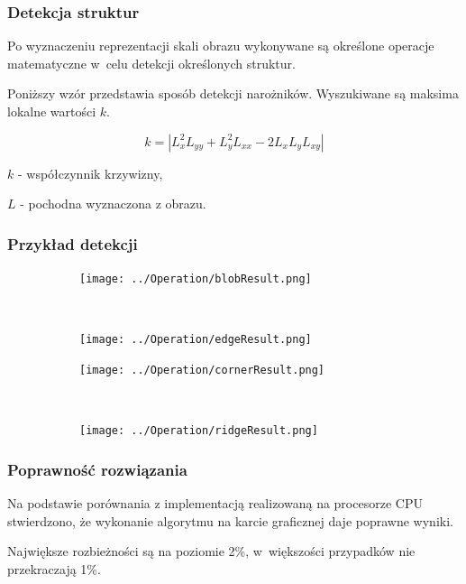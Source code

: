 \begin{frame}
\frametitle{Detekcja struktur}

Po wyznaczeniu reprezentacji skali obrazu wykonywane są określone operacje matematyczne w~celu detekcji określonych struktur.

Poniższy wzór przedstawia sposób detekcji narożników. Wyszukiwane są maksima lokalne wartości $ k $.

$$ k = |L_x^2L_{yy}  + L_y^2L_{xx} - 2L_xL_yL_{xy}| $$

$ k $ - współczynnik krzywizny,

$ L $ - pochodna wyznaczona z obrazu.



\end{frame}
\begin{frame}
\frametitle{Przykład detekcji}

\begin{figure}[h]
\begin{center}
\begin{subfigure}[b]{2cm}
\centering
\texttt{[image: ../Operation/blobResult.png]}
\end{subfigure}~
\begin{subfigure}[b]{2cm}
\centering
\texttt{[image: ../Operation/edgeResult.png]}
\end{subfigure}

\begin{subfigure}[b]{2cm}
\centering
\texttt{[image: ../Operation/cornerResult.png]}
\end{subfigure}~
\begin{subfigure}[b]{2cm}
\centering
\texttt{[image: ../Operation/ridgeResult.png]}
\end{subfigure}
\label{fig:wynik}
\end{center}
\end{figure}

\end{frame}
\begin{frame}
\frametitle{Poprawność rozwiązania}

Na podstawie porównania z implementacją realizowaną na procesorze CPU stwierdzono, że wykonanie algorytmu na karcie graficznej daje poprawne wyniki.

Największe rozbieżności są na poziomie 2\%, w~większości przypadków nie przekraczają 1\%.


\end{frame}
